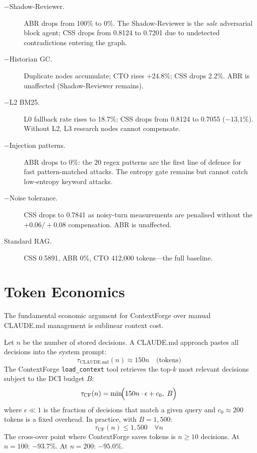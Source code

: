 \documentclass[11pt]{article}
\begin{document}
\begin{description}
  \item[$-$Shadow-Reviewer.]
    ABR drops from 100\% to 0\%. The Shadow-Reviewer is the \emph{sole}
    adversarial block agent; CSS drops from 0.8124 to 0.7201 due to
    undetected contradictions entering the graph.

  \item[$-$Historian GC.]
    Duplicate nodes accumulate; CTO rises $+24.8\%$; CSS drops 2.2\%.
    ABR is unaffected (Shadow-Reviewer remains).

  \item[$-$L2 BM25.]
    L0 fallback rate rises to 18.7\%; CSS drops from 0.8124 to 0.7055
    ($-13.1\%$). Without L2, L3 research nodes cannot compensate.

  \item[$-$Injection patterns.]
    ABR drops to 0\%: the 20 regex patterns are the first line of
    defence for fast pattern-matched attacks. The entropy gate remains but
    cannot catch low-entropy keyword attacks.

  \item[$-$Noise tolerance.]
    CSS drops to 0.7841 as noisy-turn measurements are penalised without
    the $+0.06/+0.08$ compensation. ABR is unaffected.

  \item[Standard RAG.]
    CSS 0.5891, ABR 0\%, CTO 412{,}000 tokens---the full baseline.
\end{description}

\section{Token Economics}
\label{sec:tokeneconomics}

The fundamental economic argument for ContextForge over manual CLAUDE.md
management is sublinear context cost.

Let $n$ be the number of stored decisions. A CLAUDE.md approach pastes all
decisions into the system prompt:
\[
  \tau_{\text{CLAUDE.md}}(n) \approx 150 n \quad \text{(tokens)}
\]
The ContextForge \texttt{load\_context} tool retrieves the top-$k$ most
relevant decisions subject to the DCI budget $B$:
\[
  \tau_{\text{CF}}(n) = \min\!\Bigl(150 n \cdot \epsilon + c_0,\; B\Bigr)
\]
where $\epsilon \ll 1$ is the fraction of decisions that match a given
query and $c_0 \approx 200$ tokens is a fixed overhead. In practice, with
$B = 1{,}500$:
\[
  \tau_{\text{CF}}(n) \leq 1{,}500 \quad \forall n
\]
The cross-over point where ContextForge saves tokens is $n \geq 10$ decisions.
At $n = 100$: $-93.7\%$. At $n = 200$: $-95.0\%$.
\end{document}
